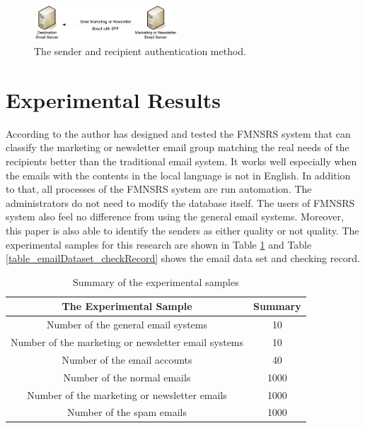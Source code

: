 \documentclass[conference]{IEEEtran}
\begin{document}
\begin{figure}
\centering
\includegraphics[width=0.48\textwidth]{7.pdf}
\caption{The sender and recipient authentication method.}
\label{fig:AuthenticationMethod}
\end{figure}


\section{Experimental Results}
According to the author has designed and tested the FMNSRS system that can classify the marketing or newsletter email group matching the real needs of the recipients better than the traditional email system.
It works well especially when the emails with the
contents in the local language is not in English.
In addition to that, all processes of the FMNSRS system are run automation.
The administrators do not need to modify the database itself. 
The users of FMNSRS system also feel no difference from using the general email systems. 
Moreover, this paper is also able to identify the senders as either quality or not quality.
The experimental samples for this research are shown in Table \ref{table_inputData} and Table \ref{table_emailDataset_checkRecord} shows the email data set and checking record.

\begin{table}[!t]
\renewcommand{\arraystretch}{1.2}
\caption{Summary of the experimental samples}
\label{table_inputData}
\centering
\begin{tabular}{c|c}
\hline
\bfseries The Experimental Sample & \bfseries Summary\\
\hline
Number of the general email systems & 10\\
\hline
Number of the marketing or newsletter email systems & 10\\
\hline
Number of the email accounts & 40\\
\hline
Number of the normal emails & 1000\\
\hline
Number of the marketing or newsletter emails& 1000\\
\hline
Number of the spam emails& 1000\\
\hline
\end{tabular}
\end{table}
\end{document}
